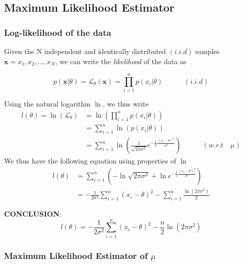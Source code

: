 \documentclass{article}
\begin{document}
\subsection{Maximum Likelihood Estimator}
\subsubsection{Log-likelihood of the data}
Given the N independent and identically distributed $(i.i.d)$ samples $\mathbf{x} = {x_1,x_2,...,x_N}$, we can write the \textit{likelihood} of the data as

\begin{equation} \label{eq2}
p(\mathbf{x}|\theta)=\mathcal{L}_{\theta}(\mathbf{x})=\prod\limits_{i=1}^{n}p(x_i|\theta) \quad\quad\quad (i.i.d)
\end{equation}

Using the natural logarithm $\ln$, we thus write
\[
\begin{split}
l(\theta) = \ln(\mathcal{L}_{\theta}) & = \ln(\prod\limits_{i=1}^{n}p(x_i|\theta)) \\
& = \sum\limits_{i=1}^{n}\ln(p(x_i|\theta)) \\
& = \sum\limits_{i=1}^{n}\ln(\frac{1}{\sqrt{2\pi\sigma^2}}e^{-\frac{1}{2}\frac{(x_i-\theta)^2}{\sigma^2}}) \quad\quad\quad (w.r.t \quad \mu)
\end{split}
\]
We thus have the following equation using properties of $\ln$
\[
\begin{split}
l(\theta) & = \sum\limits_{i=1}^{n}{(-\ln\sqrt{2\pi\sigma^2} + \ln e^{-\frac{1}{2}\frac{(x_i-\theta)^2}{\sigma^2}})} \\
& = - \frac{1}{2\sigma^2}\sum\limits_{i=1}^{n}(x_i-\theta)^2-\sum\limits_{i=1}^{n}\frac{\ln(2\pi\sigma^2)}{2}
\end{split}
\]

\textbf{CONCLUSION}:
\begin{equation} \label{eq3}
\boxed{
l(\theta) = - \frac{1}{2\sigma^2}\sum\limits_{i=1}^{n}(x_i-\theta)^2-\frac{n}{2}\ln(2\pi\sigma^2)
}
\end{equation}

\subsubsection{Maximum Likelihood Estimator of $\mu$}
\end{document}

